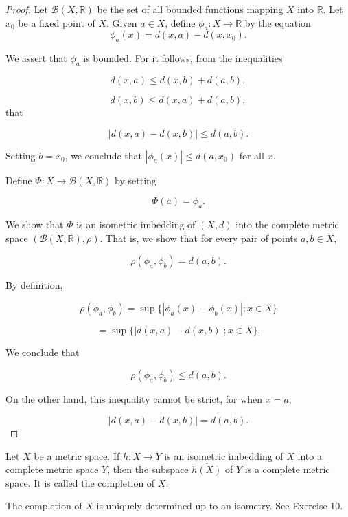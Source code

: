 \begin{proof}
Let \(\mathcal{B}({X,\mathbb{R}})\) be the set of all bounded functions mapping \(X\) into \(\mathbb{R}\). Let \(x_{0}\) be a fixed point of \(X\). Given \(a \in X\), define \({\phi }_{a} : X \rightarrow \mathbb{R}\) by the equation
\[
{\phi }_{a}(x) = d({x,a}) - d({x,x_{0}}).
\]

We assert that \({\phi }_{a}\) is bounded. For it follows, from the inequalities

\[
d({x,a}) \leq d({x,b}) + d({a,b}),
\]

\[
d({x,b}) \leq d({x,a}) + d({a,b}),
\]
that

\[
| {d({x,a}) - d({x,b}) }| \leq d({a,b}).
\]

Setting \(b = x_{0}\), we conclude that \(| {{\phi }_{a}(x) }| \leq d({a,x_{0}})\) for all \(x\).

Define \(\Phi : X \rightarrow \mathcal{B}({X,\mathbb{R}})\) by setting

\[
\Phi ( a) = {\phi }_{a}.
\]

We show that \(\Phi\) is an isometric imbedding of \((X, d)\) into the complete metric space \(({\mathcal{B}({X,\mathbb{R}}),\rho })\). That is, we show that for every pair of points \(a,b \in X\),

\[
\rho ({{\phi }_{a},{\phi }_{b}}) = d({a,b}).
\]

By definition,

\[
\rho ({{\phi }_{a},{\phi }_{b}}) = \sup \{ {| {{\phi }_{a}(x) - {\phi }_{b}(x) }| ;x \in X}\}
\]

\[
= \sup \{ | {d({x,a}) - d({x,b}) }| ;x \in X\}.
\]

We conclude that

\[
\rho ({{\phi }_{a},{\phi }_{b}}) \leq d({a,b}).
\]

On the other hand, this inequality cannot be strict, for when \(x = a\),

\[
| {d({x,a}) - d({x,b}) }| = d({a,b}).
\]
\end{proof}
\begin{definition}
Let \(X\) be a metric space. If \(h : X \rightarrow Y\) is an isometric imbedding of \(X\) into a complete metric space \(Y\), then the subspace \(\overline{h(X)}\) of \(Y\) is a complete metric space. It is called the completion of \(X\).
\end{definition}

The completion of \(X\) is uniquely determined up to an isometry. See Exercise 10.

